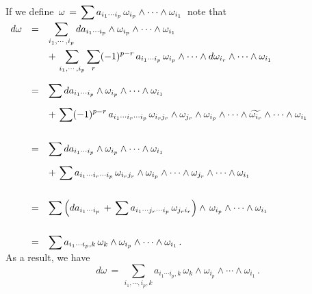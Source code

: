 \documentclass{article}[12pt,a4paper]
\begin{document}
\newpage
If we define \,$\displaystyle \omega \,=\, \sum a_{i_1\cdots i_p}\, \omega_{i_p} \wedge\cdots\wedge \omega_{i_1}$\, note that\\[0.1in]
$\begin{array}{rcl}
d\omega &=& \displaystyle \sum_{i_1,\cdots,i_p} da_{i_1\cdots i_p} \wedge 
	\omega_{i_p} \wedge\cdots\wedge \omega_{i_1} \\[0.2in]
&& \displaystyle 
	+\, \sum_{i_1,\cdots,i_p} \sum_{r} (-1)^{p-r}\, a_{i_1\cdots i_p}\,
	\omega_{i_p} \wedge\cdots\wedge d\omega_{i_r} \wedge\cdots\wedge \omega_{i_1}\\[0.3in]
&=& \displaystyle 
	\sum da_{i_1\cdots i_p} \wedge \omega_{i_p} \wedge\cdots\wedge \omega_{i_1} \\[0.15in]
&& \displaystyle 
	+\, \sum (-1)^{p-r}\, a_{i_1\cdots i_r \cdots i_p}\, \omega_{i_rj_r} \wedge \omega_{j_r} \wedge
	\omega_{i_p} \wedge\cdots\wedge \widetilde{\omega_{i_r}} \wedge\cdots\wedge \omega_{i_1}\\[0.3in]
&=& \displaystyle 
	\sum da_{i_1\cdots i_p} \wedge \omega_{i_p} \wedge\cdots\wedge \omega_{i_1} \\[0.15in]
&& \displaystyle 
	+\, \sum a_{i_1\cdots i_r \cdots i_p}\, \omega_{i_rj_r} \wedge
	\omega_{i_p} \wedge\cdots\wedge \omega_{j_r} \wedge\cdots\wedge \omega_{i_1} \\[0.3in]
&=& \displaystyle
	\sum \Big(da_{i_1\cdots i_p} \,+\, \sum a_{i_1\cdots j_r \cdots i_p}\, \omega_{j_ri_r}\Big)
	\wedge \, \omega_{i_p} \wedge\cdots\wedge \omega_{i_1} \\[0.3in]
&=& \displaystyle 
	\sum a_{i_1\cdots i_p, k}\, \omega_k \wedge \omega_{i_p} \wedge\cdots\wedge \omega_{i_1}\,. \\
\end{array}$ \\[0.1in]

As a result, we have 
\begin{equation*}
d\omega \,=\, \sum_{i_1,\cdots,i_p,k} a_{i_1\cdots i_p, k}\, \omega_k \wedge \omega_{i_p} \wedge\cdots\wedge \omega_{i_1}\,.
\end{equation*}
\end{document}
